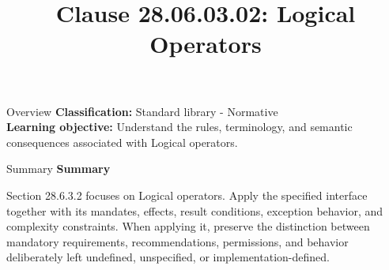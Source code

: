 \documentclass[10pt,letterpaper]{article}
\title{Clause 28.06.03.02: Logical Operators}
\author{}
\date{}
\begin{document}
\maketitle
\begin{CornellOverviewBox}{Overview}
\textbf{Classification:} Standard library - Normative\\[2pt]
\textbf{Learning objective:} Understand the rules, terminology, and semantic consequences associated with Logical operators.
\end{CornellOverviewBox}\begin{CornellSummaryBox}{Summary}
{\sffamily\bfseries\color{Accent} Summary}\par\vspace{3pt}Section 28.6.3.2 focuses on Logical operators. Apply the specified interface together with its mandates, effects, result conditions, exception behavior, and complexity constraints. When applying it, preserve the distinction between mandatory requirements, recommendations, permissions, and behavior deliberately left undefined, unspecified, or implementation-defined.
\end{CornellSummaryBox}
\end{document}
